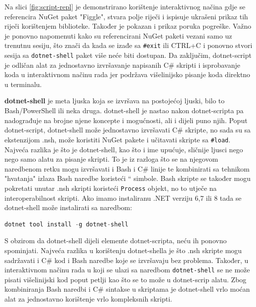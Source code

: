 \documentclass{foi}
\begin{document}
Na slici \ref{fig:script-repl} je demonstrirano korištenje interaktivnog načina gdje se referencira NuGet paket "Figgle", stvara polje riječi i ispisuje ukrašeni prikaz tih riječi korištenjem biblioteke. Također je pokazan i prikaz poruka pogreške. Važno je ponovno napomenuti kako su referencirani NuGet paketi vezani samo uz trenutnu sesiju, što znači da kada se izađe sa \verb|#exit| ili CTRL+C i ponovno stvori sesija sa \verb|dotnet-shell| paket više neće biti dostupan.
Da zaključim, dotnet-script je odličan alat za jednostavno izvršavanje napisanih C\# skripti i isprobavanje koda u interaktivnom načinu rada jer podržava višelinijsko pisanje koda direktno u terminalu.

\textbf{dotnet-shell} je meta ljuska koja se izvršava na postojećoj ljuski, bilo to Bash/PowerShell ili neka druga. dotnet-shell je nastao nakon dotnet-scripta pa nadograđuje na brojne njene koncepte i mogućnosti, ali i dijeli puno njih. Poput dotnet-script, dotnet-shell može jednostavno izvršavati C\# skripte, no sada su sa ekstenzijom .nsh, može koristiti NuGet pakete i učitavati skripte sa \verb|#load|. Najveća razlika je što je dotnet-shell, kao što i ime upućuje, sličnije ljusci nego nego samo alatu za pisanje skripti. To je iz razloga što se na njegovom naredbenom retku mogu izvršavati i Bash i C\# linije te kombinirati sa tehnikom "hvatanja" izlaza Bash naredbe koristeći `` simbole. Bash skripte se također mogu pokretati unutar .nsh skripti koristeći \verb|Process| objekt, no to utječe na interoperabilnost skripti. Ako imamo instaliranu .NET verziju 6,7 ili 8 tada se dotnet-shell može instalirati sa naredbom\cite{gitshell}:
\begin{lstlisting}[language=C++]
dotnet tool install -g dotnet-shell
\end{lstlisting}
S obzirom da dotnet-shell dijeli elemente dotnet-scripta, neću ih ponovno spominjati. Najveća razlika u korištenju dotnet-shella je što .nsh skripte mogu sadržavati i C\# kod i Bash naredbe koje se izvršavaju bez problema. Također, u interaktivnom načinu rada u koji se ulazi sa naredbom \verb|dotnet-shell| se ne može pisati višelinijski kod poput petlji kao što se to može u dotnet-scrip alatu. Zbog kombiniranja Bash naredbi i C\# sintakse u skriptama je dotnet-shell vrlo moćan alat za jednostavno korištenje vrlo kompleksnih skripti.
\end{document}
